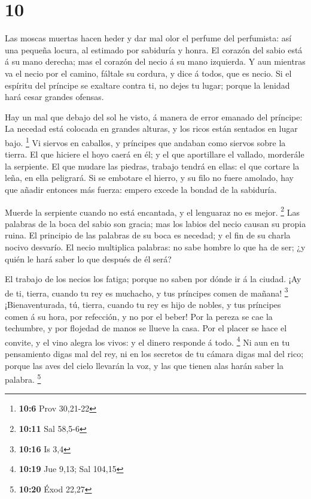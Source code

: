 \hypertarget{section-9}{%
\section{10}\label{section-9}}

 Las moscas muertas hacen heder y dar mal olor el perfume
del perfumista: así una pequeña locura, al estimado por sabiduría y
honra.  El corazón del sabio está á su mano derecha; mas el
corazón del necio á su mano izquierda.  Y aun mientras va el
necio por el camino, fáltale su cordura, y dice á todos, que es necio.
 Si el espíritu del príncipe se exaltare contra ti, no dejes
tu lugar; porque la lenidad hará cesar grandes ofensas.

 Hay un mal que debajo del sol he visto, á manera de error
emanado del príncipe:  La necedad está colocada en grandes
alturas, y los ricos están sentados en lugar bajo. \footnote{\textbf{10:6}
  Prov 30,21-22}  Vi siervos en caballos, y príncipes que
andaban como siervos sobre la tierra.  El que hiciere el
hoyo caerá en él; y el que aportillare el vallado, morderále la
serpiente.  El que mudare las piedras, trabajo tendrá en
ellas: el que cortare la leña, en ella peligrará.  Si se
embotare el hierro, y su filo no fuere amolado, hay que añadir entonces
más fuerza: empero excede la bondad de la sabiduría.

 Muerde la serpiente cuando no está encantada, y el
lenguaraz no es mejor. \footnote{\textbf{10:11} Sal 58,5-6}
 Las palabras de la boca del sabio son gracia; mas los
labios del necio causan su propia ruina.  El principio de
las palabras de su boca es necedad; y el fin de su charla nocivo
desvarío.  El necio multiplica palabras: no sabe hombre lo
que ha de ser; ¿y quién le hará saber lo que después de él será?

 El trabajo de los necios los fatiga; porque no saben por
dónde ir á la ciudad.  ¡Ay de ti, tierra, cuando tu rey es
muchacho, y tus príncipes comen de mañana! \footnote{\textbf{10:16} Is
  3,4}  ¡Bienaventurada, tú, tierra, cuando tu rey es hijo
de nobles, y tus príncipes comen á su hora, por refección, y no por el
beber!  Por la pereza se cae la techumbre, y por flojedad
de manos se llueve la casa.  Por el placer se hace el
convite, y el vino alegra los vivos: y el dinero responde á todo.
\footnote{\textbf{10:19} Jue 9,13; Sal 104,15}  Ni aun en
tu pensamiento digas mal del rey, ni en los secretos de tu cámara digas
mal del rico; porque las aves del cielo llevarán la voz, y las que
tienen alas harán saber la palabra. \footnote{\textbf{10:20} Éxod 22,27}

